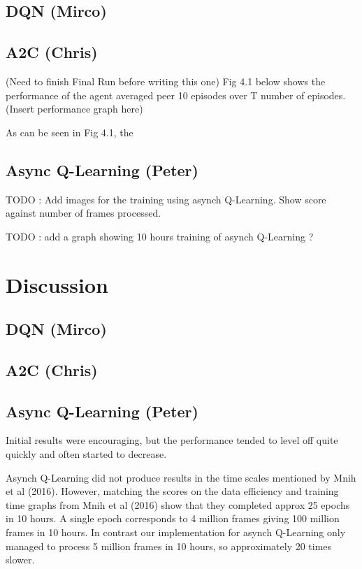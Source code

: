 \documentclass{article}
\begin{document}

\subsection{DQN (Mirco)}
\subsection{A2C (Chris)}

(Need to finish Final Run before writing this one)
Fig 4.1 below shows the performance of the agent averaged peer 10 episodes over T number of episodes.
(Insert performance graph here)

As can be seen in Fig 4.1, the

\subsection{Async Q-Learning (Peter)}

TODO : Add images for the training using asynch Q-Learning.
Show score against number of frames processed.

TODO : add a graph showing 10 hours training of asynch Q-Learning ?

\section{Discussion}
    

\subsection{DQN (Mirco)}

\subsection{A2C (Chris)}
\subsection{Async Q-Learning (Peter)}

Initial results were encouraging, but the performance tended to level off quite quickly and often started to decrease.

Asynch Q-Learning did not produce results in the time scales mentioned by Mnih et al (2016).
However, matching the scores on the data efficiency and training time graphs from Mnih et al (2016) show that they completed approx 25 epochs in 10 hours.
A single epoch corresponds to 4 million frames giving 100 million frames in 10 hours.
In contrast our implementation for asynch Q-Learning only managed to process 5 million frames in 10 hours, so approximately 20 times slower.
\end{document}
